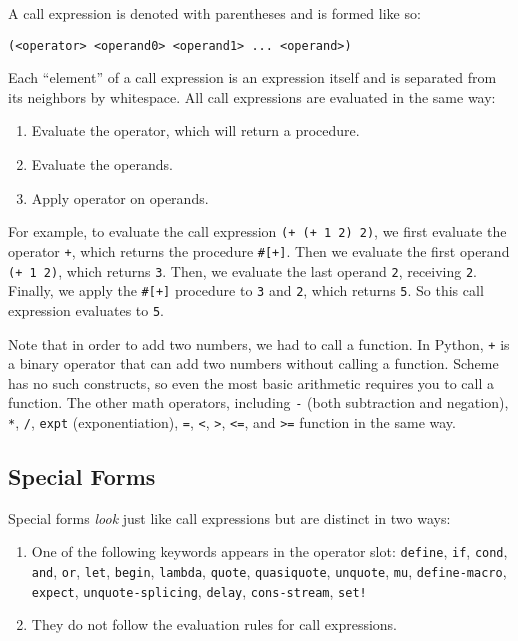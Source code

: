 A call expression is denoted with parentheses and is formed like so:
\vspace{0.5mm}
\begin{lstlisting}
(<operator> <operand0> <operand1> ... <operand>)
\end{lstlisting}
Each ``element'' of a call expression is an expression itself and is separated from its
neighbors by whitespace. All call expressions are evaluated in the same way:
\begin{enumerate}
\item Evaluate the operator, which will return a procedure.
\item Evaluate the operands.
\item Apply operator on operands.
\end{enumerate}
For example, to evaluate the call expression \lstinline{(+ (+ 1 2) 2)}, we first evaluate the operator \lstinline{+}, which returns the procedure \lstinline{#[+]}. Then we evaluate the first operand \lstinline{(+ 1 2)}, which returns \lstinline{3}. Then, we evaluate the last operand \lstinline{2}, receiving \lstinline{2}. Finally, we apply the \lstinline{#[+]} procedure to \lstinline{3} and \lstinline{2}, which returns \lstinline{5}. So this call expression evaluates to \lstinline{5}. 

Note that in order to add two numbers, we had to call a function. In Python, \lstinline{+} is a binary operator that can add two numbers without calling a function. Scheme has no such constructs, so even the most basic arithmetic requires you to call a function. The other math operators, including \lstinline{-} (both subtraction and negation), \lstinline{*}, \lstinline{/}, \lstinline{expt} (exponentiation), \lstinline{=}, \lstinline{<}, \lstinline{>}, \lstinline{<=}, and \lstinline{>=} function in the same way. 

\subsection{Special Forms}

Special forms \textit{look} just like call expressions but are distinct in two ways: 
\begin{enumerate}
    \item One of the following keywords appears in the operator slot: \lstinline{define}, \lstinline{if}, \lstinline{cond}, \lstinline{and}, \lstinline{or}, \lstinline{let}, \lstinline{begin}, \lstinline{lambda}, \lstinline{quote}, \lstinline{quasiquote}, \lstinline{unquote}, \lstinline{mu}, \lstinline{define-macro}, \lstinline{expect}, \lstinline{unquote-splicing}, \lstinline{delay}, \lstinline{cons-stream}, \lstinline{set!}
    \item They do not follow the evaluation rules for call expressions.
\end{enumerate}

